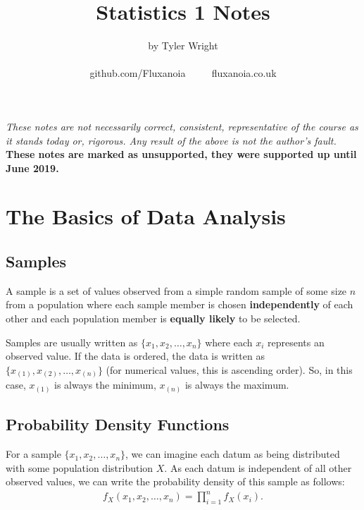 \documentclass[a4paper, 12pt, twoside]{article}
\begin{document}
\title{Statistics 1 Notes}
\date{}
\author{by Tyler Wright \\
  \\
  github.com/Fluxanoia $\qquad$ fluxanoia.co.uk
}
\maketitle

\vfill

\textit{These notes are not necessarily correct,
consistent, representative of the course as it stands today or, 
rigorous. Any result of the above is not the author's fault.}
\\[\baselineskip]
\textbf{These notes are marked as unsupported, they were supported
up until June 2019.}

\newpage

\section{The Basics of Data Analysis}

\subsection{Samples}

A sample is a set of values observed from a simple random sample of
some size $n$ from a population where each sample member is chosen
\textbf{independently} of each other and each population member is
\textbf{equally likely} to be selected.

\vspace{\baselineskip}

Samples are usually written as $\{x_1, x_2, \ldots, x_n\}$ where
each $x_i$ represents an observed value. If the data is ordered,
the data is written as $\{x_{(1)}, x_{(2)}, \ldots, x_{(n)}\}$
(for numerical values, this is ascending order). So, in this
case, $x_{(1)}$ is always the minimum, $x_{(n)}$ is always
the maximum.

\subsection{Probability Density Functions}

For a sample $\{x_1, x_2, \ldots, x_n\}$, we can imagine each
datum as being distributed with some population distribution
$X$. As each datum is independent of all other observed values, we
can write the probability density of this sample as follows:
\begin{align*}
    f_X(x_1, x_2, \ldots, x_n) = \prod_{i = 1}^n f_X(x_i).
\end{align*}
\end{document}

